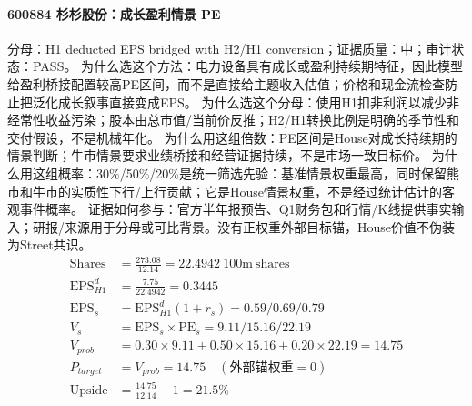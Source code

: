 \paragraph{600884 杉杉股份：成长盈利情景 PE}
分母：H1 deducted EPS bridged with H2/H1 conversion；证据质量：中；审计状态：PASS。
为什么选这个方法：电力设备具有成长或盈利持续期特征，因此模型给盈利桥接配置较高PE区间，而不是直接给主题收入估值；价格和现金流检查防止把泛化成长叙事直接变成EPS。
为什么选这个分母：使用H1扣非利润以减少非经常性收益污染；股本由总市值/当前价反推；H2/H1转换比例是明确的季节性和交付假设，不是机械年化。
为什么用这组倍数：PE区间是House对成长持续期的情景判断；牛市情景要求业绩桥接和经营证据持续，不是市场一致目标价。
为什么用这组概率：30\%/50\%/20\%是统一筛选先验：基准情景权重最高，同时保留熊市和牛市的实质性下行/上行贡献；它是House情景权重，不是经过统计估计的客观事件概率。
证据如何参与：官方半年报预告、Q1财务包和行情/K线提供事实输入；研报/来源用于分母或可比背景。没有正权重外部目标锚，House价值不伪装为Street共识。
\begin{align*}
\mathrm{Shares} &= \frac{273.08}{12.14}=22.4942\ \mathrm{100m\ shares}\\
\mathrm{EPS}_{H1}^d &= \frac{7.75}{22.4942}=0.3445\\
\mathrm{EPS}_s &= \mathrm{EPS}_{H1}^d(1+r_s)=0.59/0.69/0.79\\
V_s &= \mathrm{EPS}_s\times \mathrm{PE}_s=9.11/15.16/22.19\\
V_{prob} &= 0.30\times 9.11+0.50\times 15.16+0.20\times 22.19=14.75\\
P_{target} &= V_{prob}=14.75\quad(\text{外部锚权重}=0)\\
\mathrm{Upside} &= \frac{14.75}{12.14}-1=21.5\%\\
\end{align*}

